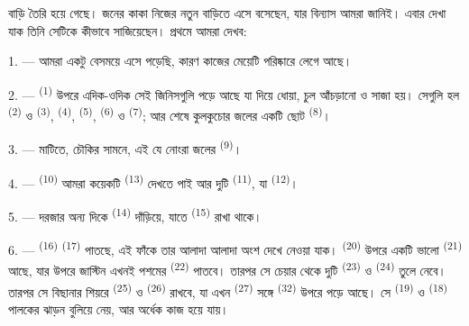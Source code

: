 %

\VUsaut{6.0mm}
\VUsaut{1.4mm}
\VUsaut{0.4mm}
\VUsaut{2.2mm}

বাড়ি তৈরি হয়ে গেছে। জনের কাকা নিজের নতুন বাড়িতে এসে বসেছেন, যার বিন্যাস
আমরা জানিই। এবার দেখা যাক তিনি সেটিকে কীভাবে সাজিয়েছেন। প্রথমে আমরা দেখব:

\VUsaut{3.0mm}

1. --- আমরা একটু বেসময়ে এসে পড়েছি, কারণ কাজের মেয়েটি 
পরিষ্কারে লেগে আছে।

2. ---  \textsuperscript{(1)} উপরে এদিক-ওদিক সেই
জিনিসগুলি পড়ে আছে যা দিয়ে ধোয়া, চুল আঁচড়ানো ও সাজা হয়। সেগুলি হল
 \textsuperscript{(2)} ও  \textsuperscript{(3)},
 \textsuperscript{(4)},  \textsuperscript{(5)},
 \textsuperscript{(6)} ও  \textsuperscript{(7)}; আর
শেষে কুলকুচোর জলের একটি ছোট  \textsuperscript{(8)}।

3. --- মাটিতে, চৌকির সামনে, এই যে নোংরা জলের 
\textsuperscript{(9)}।

4. ---  \textsuperscript{(10)} আমরা কয়েকটি 
\textsuperscript{(13)} দেখতে পাই আর দুটি  \textsuperscript{(11)}, যা
 \textsuperscript{(12)}।

5. --- দরজার অন্য দিকে  \textsuperscript{(14)}
দাঁড়িয়ে, যাতে  \textsuperscript{(15)} রাখা থাকে।

6. ---  \textsuperscript{(16)} 
\textsuperscript{(17)} পাতছে, এই ফাঁকে তার আলাদা আলাদা অংশ দেখে নেওয়া যাক।
 \textsuperscript{(20)} উপরে একটি ভালো 
\textsuperscript{(21)} আছে, যার উপরে জাস্টিন এখনই পশমের 
\textsuperscript{(22)} পাতবে। তারপর সে চেয়ার থেকে দুটি 
\textsuperscript{(23)} ও  \textsuperscript{(24)} তুলে নেবে। তারপর সে
বিছানার শিয়রে  \textsuperscript{(25)} ও 
\textsuperscript{(26)} রাখবে, যা এখন  \textsuperscript{(27)} সঙ্গে
 \textsuperscript{(32)} উপরে পড়ে আছে। সে
 \textsuperscript{(19)} ও  \textsuperscript{(18)}
পালকের ঝাড়ন বুলিয়ে নেয়, আর অর্ধেক কাজ হয়ে যায়।

